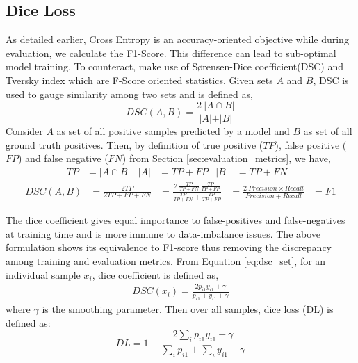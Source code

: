 \subsection{Dice Loss}
As detailed earlier, Cross Entropy is an accuracy-oriented objective while during evaluation, we calculate the F1-Score. This difference can lead to sub-optimal model training. To counteract, \cite{li2019dice} make use of S{\o}rensen-Dice coefficient(DSC)\cite{sorensen1948method, dice1945measures} and Tversky index\cite{tversky1977features} which are F-Score oriented statistics. Given sets $A$ and $B$, DSC is used to gauge similarity among two sets and is defined as,
\begin{equation}
\label{eq:dsc_set}
    DSC(A, B) = \frac{2\ \vert A \cap B \vert}{\vert A \vert + \vert B \vert}
\end{equation}
Consider $A$ as set of all positive samples predicted by a model and $B$ as set of all ground truth positives. Then, by definition of true positive ($TP$), false positive ($FP$) and false negative ($FN$) from Section \ref{sec:evaluation_metrics}, we have,
\begin{align*}
    TP &= \vert A \cap B \vert &
    \vert A \vert &= TP + FP &
    \vert B \vert &= TP + FN &
\end{align*}
\begin{align*}
     DSC(A, B) &= \frac{2TP}{2TP + FP + FN} &= \frac{2\ \frac{TP}{TP + FN}\ \frac{TP}{TP + FP}}{\frac{TP}{TP + FN} + \frac{TP}{TP + FP}} &= \frac{2\ Precision \times Recall}{Precision + Recall} &= F1
\end{align*}

The dice coefficient gives equal importance to false-positives and false-negatives at training time and is more immune to data-imbalance issues\cite{sudre2017generalised, shen2018influence, kodym2018segmentation}. The above formulation shows its equivalence to F1-score thus removing the discrepancy among training and evaluation metrics. From Equation \eqref{eq:dsc_set}, for an individual sample $x_i$, dice coefficient is defined as,
\begin{align*}
    DSC(x_i) = \frac{2p_{i1}y_{i1} + \gamma}{p_{i1} + y_{i1} + \gamma}
\end{align*}
where $\gamma$ is the smoothing parameter. Then over all samples, dice loss (DL) is defined as:
\begin{equation}
    DL = 1 - \frac{2\sum_i{p_{i1}y_{i1}} + \gamma}{\sum_i{p_{i1}} + \sum_i{y_{i1}} + \gamma}
\end{equation}


